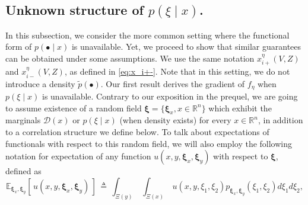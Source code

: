 \documentclass[11pt,reqno]{amsart}
\newcommand{\1}{{\bf 1}}
\newcommand{\2}{{\bf 2}}
\newcommand{\mr}[1]{{\color{blue}#1}}
\newcommand{\pc}[1]{{\color{cyan}#1}}
\newcommand{\us}[1]{\textcolor{red}{#1}}
\newcommand{\bxi}{\boldsymbol{\xi}}
\newcommand{\R}{\mathbb R}
\newcommand{\cd}{\mathcal D}
\numberwithin{equation}{section}
\theoremstyle{remark}
\begin{document}
{
					
					\subsection{Unknown structure of $p(\xi \mid x)$.}\label{sub:p_unknown} 
					In this subsection, we consider the more common setting where the functional form of $p(\bullet \mid x)$ is unavailable. Yet, we proceed to show that similar guarantees can be obtained under some assumptions.  We use the same notation $x_{i+}^\eta{(V,Z)}$ and $x_{i-}^\eta{(V,Z)}$, as defined in \eqref{eq:x_i+-}. Note that in this setting, we do not introduce a density $\tilde{p}(\bullet)$.
					Our first result derives the gradient of $f_{\eta}$ when $p(\xi\mid x)$ is unavailable. 
					Contrary to our exposition in the prequel, we are going to assume existence of a random field ${\bxi} = \{\bxi_{x}, x \in \R^n\}$ which exhibit the marginals $\cd(x)$ or $p(\xi \mid x)$ (when density exists) for every $x \in \R^n$, in addition to a correlation structure we define below. To talk about expectations of functionals with respect to this random field, we will also employ the following notation for expectation of any function $u(x,y,\bxi_x,\bxi_y)$ with respect to $\bxi$, defined as %
					\begin{equation}\label{eq:Expxi12}
						\mathbb{E}_{\bxi_x, \bxi_y} \left[ \, u(x,y,\bxi_x,\bxi_y)\, \right] \, \triangleq \, \int_{\Xi(y)} \ \int_{\Xi(x)} \ u(x,y, \xi_1, \xi_2) p_{\bxi_x, \bxi_y}(\xi_1, \xi_2) d\xi_1 d\xi_2,

\end{equation}}
\end{document}

